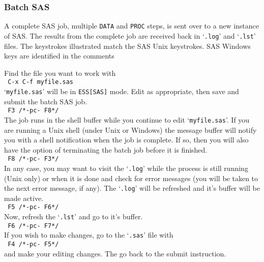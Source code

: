 \documentclass{article}
\newcommand{\stexttt}[1]{{\small\texttt{#1}}}
\newcommand{\elcode}[1]{\\{\stexttt{\hspace*{2em} #1}}\\}
\newcommand{\file}[1]{`\stexttt{#1}'}
\begin{document}

\subsubsection{Batch SAS}
\label{sec:SAS:batch}

A complete SAS job, multiple \stexttt{DATA} and \stexttt{PROC} steps,
is sent over to a new instance of SAS.  The results from the complete
job are received back in \file{.log} and \file{.lst} files.
The keystrokes illustrated match the SAS Unix keystrokes.
SAS Windows keys are identified in the comments

Find the file you want to work with
    \elcode{C-x C-f myfile.sas}
\file{myfile.sas} will be in \stexttt{ESS[SAS]} mode.
Edit as appropriate, then save and submit the batch SAS job.
    \elcode{F3  /*-pc- F8*/}
The job runs in the shell buffer while you continue to edit 
\file{myfile.sas}.  If you are running a Unix shell (under Unix or
Windows) the message buffer will notify you with a shell
notification when the job is complete.  If so, then you 
will also have the option of terminating the batch job
before it is finished.
    \elcode{F8  /*-pc- F3*/}
In any case, you may want to visit the \file{.log} while the process
is still running (Unix only) or when it is done and check for
error messages 
(you will be taken to the next error message, if any).
The \file{.log} will be refreshed and it's buffer will be made active.
    \elcode{F5  /*-pc- F6*/}
Now, refresh the \file{.lst} and go to it's buffer.
    \elcode{F6  /*-pc- F7*/}
If you wish to make changes, go to the \file{.sas} file with
    \elcode{F4 /*-pc- F5*/}
and make your editing changes.  The go back to the submit instruction.
\end{document}
